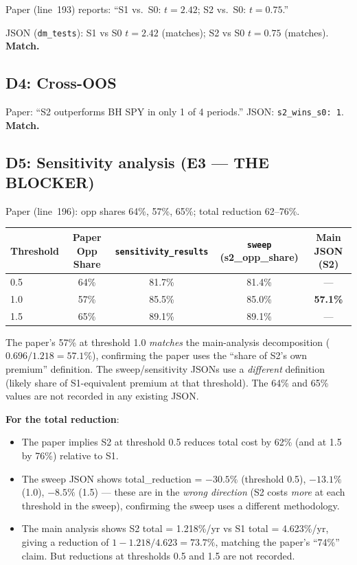 \documentclass[12pt,a4paper]{article}
\begin{document}
Paper (line~193) reports: ``S1 vs.\ S0: $t = 2.42$; S2 vs.\ S0: $t = 0.75$.''

JSON (\texttt{dm\_tests}): S1 vs S0 $t = 2.42$ (matches); S2 vs S0 $t = 0.75$ (matches). \textcolor{okgreen}{\textbf{Match.}}

\bigskip

\subsection*{D4: Cross-OOS}

Paper: ``S2 outperforms BH SPY in only 1 of 4 periods.'' JSON: \texttt{s2\_wins\_s0: 1}. \textcolor{okgreen}{\textbf{Match.}}

\bigskip

\subsection*{D5: Sensitivity analysis (E3 --- THE BLOCKER)}

Paper (line~196): opp shares 64\%, 57\%, 65\%; total reduction 62--76\%.

\begin{center}
\begin{tabular}{lcccc}
\toprule
Threshold & Paper Opp Share & \texttt{sensitivity\_results} & \texttt{sweep} (s2\_opp\_share) & Main JSON (S2) \\
\midrule
0.5 & 64\% & 81.7\% & 81.4\% & --- \\
1.0 & 57\% & 85.5\% & 85.0\% & \textbf{57.1\%} \\
1.5 & 65\% & 89.1\% & 89.1\% & --- \\
\bottomrule
\end{tabular}
\end{center}

The paper's 57\% at threshold 1.0 \emph{matches} the main-analysis decomposition ($0.696/1.218 = 57.1\%$), confirming the paper uses the ``share of S2's own premium'' definition. The sweep/sensitivity JSONs use a \emph{different} definition (likely share of S1-equivalent premium at that threshold). The 64\% and 65\% values are not recorded in any existing JSON.

\textbf{For the total reduction}:
\begin{itemize}[leftmargin=2em]
\item The paper implies S2 at threshold 0.5 reduces total cost by 62\% (and at 1.5 by 76\%) relative to S1.
\item The sweep JSON shows total\_reduction = $-30.5\%$ (threshold 0.5), $-13.1\%$ (1.0), $-8.5\%$ (1.5) --- these are in the \emph{wrong direction} (S2 costs \emph{more} at each threshold in the sweep), confirming the sweep uses a different methodology.
\item The main analysis shows S2 total = 1.218\%/yr vs S1 total = 4.623\%/yr, giving a reduction of $1 - 1.218/4.623 = 73.7\%$, matching the paper's ``74\%'' claim. But reductions at thresholds 0.5 and 1.5 are not recorded.
\end{itemize}
\end{document}
